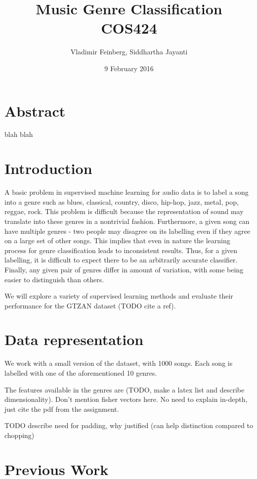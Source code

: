 \documentclass{article}
\title{Music Genre Classification\\\large COS424}
\author{Vladimir Feinberg, Siddhartha Jayanti}
\date{9 February 2016}
\begin{document}
\maketitle

\section{Abstract}
blah blah
 \section{Introduction}

A basic problem in supervised machine learning for audio data is to label a song into a genre such as blues, classical, country, disco, hip-hop, jazz, metal, pop, reggae, rock.
This problem is difficult because the representation of sound may translate into these genres in a nontrivial fashion.
Furthermore, a given song can have multiple genres - two people may disagree on its labelling even if they agree on a large set of other songs. This implies that even in nature the learning process for genre classification leads to inconsistent results. Thus, for a given labelling, it is difficult to expect there to be an arbitrarily accurate classifier.
Finally, any given pair of genres differ in amount of variation, with some being easier to distinguish than others.

We will explore a variety of supervised learning methods and evaluate their performance for the GTZAN dataset (TODO cite a ref).

\section{Data representation}

We work with a small version of the dataset, with 1000 songs. Each song is labelled with one of the aforementioned 10 genres.

The features available in the genres are (TODO, make a latex list and describe dimensionality). Don't mention fisher vectors here. No need to explain in-depth, just cite the pdf from the assignment.

TODO describe need for padding, why justified (can help distinction compared to chopping)

\section{Previous Work}
\end{document}
